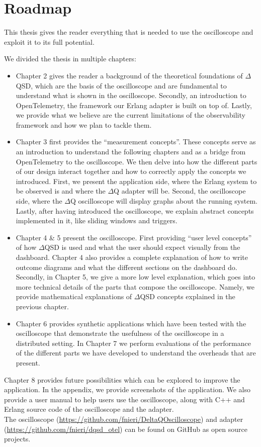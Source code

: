\section{Roadmap}
    This thesis gives the reader everything that is needed to use the oscilloscope and exploit it to its full potential.

    We divided the thesis in multiple chapters:
    \begin{itemize}
        \item Chapter 2 gives the reader a background of the theoretical foundations of $\Delta$QSD, which are the basis of the oscilloscope and are fundamental to understand what is shown in the oscilloscope. Secondly, an introduction to OpenTelemetry, the framework our Erlang adapter is built on top of. Lastly, we provide what we believe are the current limitations of the observability framework and how we plan to tackle them.
        \item Chapter 3 first provides the ``measurement concepts''. These concepts serve as an introduction to understand the following chapters and as a bridge from OpenTelemetry to the oscilloscope.  We then delve into how the different parts of our design interact together and how to correctly apply the concepts we introduced. First, we present the application side, where the Erlang system to be observed is and where the $\Delta$Q adapter will be. Second, the oscilloscope side, where the $\Delta$Q oscilloscope will display graphs about the running system. Lastly, after having introduced the oscilloscope, we explain abstract concepts implemented in it, like sliding windows and triggers.
        \item Chapter 4 \& 5 present the oscilloscope. First providing ``user level concepts'' of how $\Delta$QSD is used and what the user should expect visually from the dashboard. Chapter 4 also provides a complete explanation of how to write outcome diagrams and what the different sections on the dashboard do.
            Secondly, in Chapter 5, we give a more low level explanation, which goes into more technical details of the parts that compose the oscilloscope. Namely, we provide mathematical explanations of $\Delta$QSD concepts explained in the previous chapter.
        \item Chapter 6 provides synthetic applications which have been tested with the oscilloscope that demonstrate the usefulness of the oscilloscope in a distributed setting. In Chapter 7 we perform evaluations of the performance of the different parts we have developed to understand the overheads that are present.
    \end{itemize}

    Chapter 8 provides future possibilities which can be explored to improve the application. In the appendix, we provide screenshots of the application. We also provide a user manual to help users use the oscilloscope, along with C++ and Erlang source code of the oscilloscope and the adapter. \\
   \sloppy The oscilloscope (\url{https://github.com/fnieri/DeltaQOscilloscope}) and adapter (\url{https://github.com/fnieri/dqsd_otel}) can be found on GitHub as open source projects.
